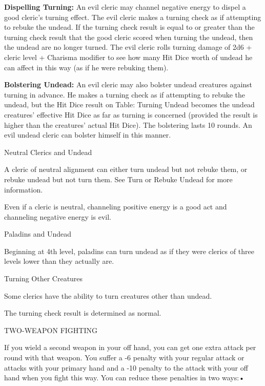 \documentclass{article}
\begin{document}
\textbf{Dispelling Turning:} An evil cleric may channel negative energy to dispel 
a good cleric's turning effect. The evil cleric makes a turning check as if attempting 
to rebuke the undead. If the turning check result is equal to or greater than the 
turning check result that the good cleric scored when turning the undead, then 
the undead are no longer turned. The evil cleric rolls turning damage of 2d6 + 
cleric level + Charisma modifier to see how many Hit Dice worth of undead he can 
affect in this way (as if he were rebuking them).

\textbf{Bolstering Undead:} An evil cleric may also bolster undead creatures against 
turning in advance. He makes a turning check as if attempting to rebuke the undead, 
but the Hit Dice result on Table: Turning Undead becomes the undead creatures' 
effective Hit Dice as far as turning is concerned (provided the result is higher 
than the creatures' actual Hit Dice). The bolstering lasts 10 rounds. An evil undead 
cleric can bolster himself in this manner.

\vspace{12pt}
Neutral Clerics and Undead

A cleric of neutral alignment can either turn undead but not rebuke them, or rebuke 
undead but not turn them. See Turn or Rebuke Undead for more information.

Even if a cleric is neutral, channeling positive energy is a good act and channeling 
negative energy is evil.

\vspace{12pt}
Paladins and Undead

Beginning at 4th level, paladins can turn undead as if they were clerics of three 
levels lower than they actually are.

\vspace{12pt}
Turning Other Creatures

Some clerics have the ability to turn creatures other than undead.

The turning check result is determined as normal.

\vspace{12pt}
TWO-WEAPON FIGHTING

If you wield a second weapon in your off hand, you can get one extra attack per 
round with that weapon. You suffer a -6 penalty with your regular attack or attacks 
with your primary hand and a -10 penalty to the attack with your off hand when 
you fight this way. You can reduce these penalties in two ways:•
\end{document}
